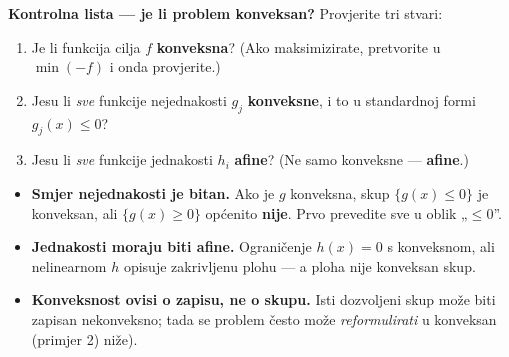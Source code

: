 \textbf{Kontrolna lista --- je li problem konveksan?} Provjerite tri stvari:

\begin{enumerate}
  \item Je li funkcija cilja $f$ \textbf{konveksna}? (Ako maksimizirate,
        pretvorite u $\min(-f)$ i onda provjerite.)
  \item Jesu li \emph{sve} funkcije nejednakosti $g_j$ \textbf{konveksne}, i to
        u standardnoj formi $g_j(x) \le 0$?
  \item Jesu li \emph{sve} funkcije jednakosti $h_i$ \textbf{afine}? (Ne samo
        konveksne --- \textbf{afine}.)
\end{enumerate}

\begin{napomena}
\begin{itemize}
  \item \textbf{Smjer nejednakosti je bitan.} Ako je $g$ konveksna, skup
        $\{g(x) \le 0\}$ je konveksan, ali $\{g(x) \ge 0\}$ općenito
        \textbf{nije}. Prvo prevedite sve u oblik „$\le 0$”.
  \item \textbf{Jednakosti moraju biti afine.} Ograničenje $h(x) = 0$ s
        konveksnom, ali nelinearnom $h$ opisuje zakrivljenu plohu --- a ploha
        nije konveksan skup.
  \item \textbf{Konveksnost ovisi o zapisu, ne o skupu.} Isti dozvoljeni skup
        može biti zapisan nekonveksno; tada se problem često može
        \emph{reformulirati} u konveksan (primjer 2) niže).
\end{itemize}
\end{napomena}

